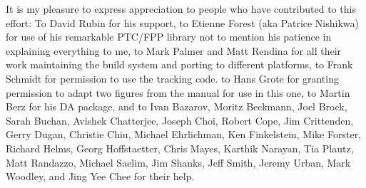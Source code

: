 It is my pleasure to express appreciation to people who have
contributed to this effort: To David Rubin for his support, to Etienne
Forest (aka Patrice Nishikwa) for use of his remarkable PTC/FPP
library not to mention his patience in explaining everything to me, to
Mark Palmer and Matt Rendina for all their work maintaining the build
system and porting \bmad to different platforms, to Frank Schmidt for
permission to use the \mad tracking code. to Hans Grote for granting
permission to adapt two figures from the \mad manual for use in this
one, to Martin Berz for his DA package, and to Ivan Bazarov, Moritz
Beckmann, Joel Brock, Sarah Buchan, Avishek Chatterjee, Joseph Choi,
Robert Cope, Jim Crittenden, Gerry Dugan, Christie Chiu, Michael
Ehrlichman, Ken Finkelstein, Mike Forster, Richard Helms, Georg
Hoffstaetter, Chris Mayes, Karthik Narayan, Tia Plautz, Matt Randazzo,
Michael Saelim, Jim Shanks, Jeff Smith, Jeremy Urban, Mark Woodley,
and Jing Yee Chee for their help.

